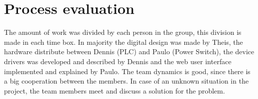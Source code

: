 \chapter{Process evaluation}
The amount of work was divided by each person in the group, this division is made in each time box. In majority the digital design was made by Theis, the hardware distribute between Dennis (PLC) and Paulo (Power Switch), the device drivers was developed and described by Dennis and the web user interface implemented and explained by Paulo.
\p
The team dynamics is good, since there is a big cooperation between the members. In case of an unknown situation in the project, the team members meet and discuss a solution for the problem.
